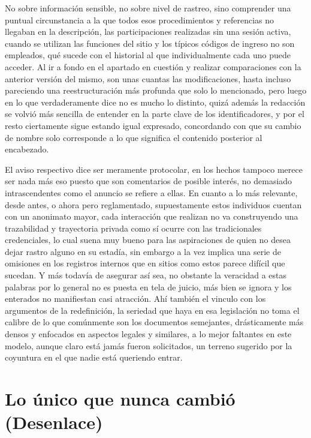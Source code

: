 \documentclass[
]{book}
\begin{document}
No sobre información sensible, no sobre nivel de rastreo, sino comprender una puntual circunstancia a la que todos esos procedimientos y referencias no llegaban en la descripción, las participaciones realizadas sin una sesión activa, cuando se utilizan las funciones del sitio y los típicos códigos de ingreso no son empleados, qué sucede con el historial al que individualmente cada uno puede acceder. Al ir a fondo en el apartado en cuestión y realizar comparaciones con la anterior versión del mismo, son unas cuantas las modificaciones, hasta incluso pareciendo una reestructuración más profunda que solo lo mencionado, pero luego en lo que verdaderamente dice no es mucho lo distinto, quizá además la redacción se volvió más sencilla de entender en la parte clave de los identificadores, y por el resto ciertamente sigue estando igual expresado, concordando con que su cambio de nombre solo corresponde a lo que significa el contenido posterior al encabezado.

El aviso respectivo dice ser meramente protocolar, en los hechos tampoco merece ser nada más eso puesto que son comentarios de posible interés, no demasiado intrascendentes como el anuncio se refiere a ellas. En cuanto a lo más relevante, desde antes, o ahora pero reglamentado, supuestamente estos individuos cuentan con un anonimato mayor, cada interacción que realizan no va construyendo una trazabilidad y trayectoria privada como sí ocurre con las tradicionales credenciales, lo cual suena muy bueno para las aspiraciones de quien no desea dejar rastro alguno en su estadía, sin embargo a la vez implica una serie de omisiones en los registros internos que en sitios como estos parece difícil que sucedan. Y más todavía de asegurar así sea, no obstante la veracidad a estas palabras por lo general no es puesta en tela de juicio, más bien se ignora y los enterados no manifiestan casi atracción. Ahí también el vinculo con los argumentos de la redefinición, la seriedad que haya en esa legislación no toma el calibre de lo que comúnmente son los documentos semejantes, drásticamente más densos y enfocados en aspectos legales y similares, a lo mejor faltantes en este modelo, aunque claro está jamás fueron solicitados, un terreno sugerido por la coyuntura en el que nadie está queriendo entrar.

\hypertarget{lo-uxfanico-que-nunca-cambiuxf3-desenlace}{%
\chapter{Lo único que nunca cambió (Desenlace)}\label{lo-uxfanico-que-nunca-cambiuxf3-desenlace}}
\end{document}
